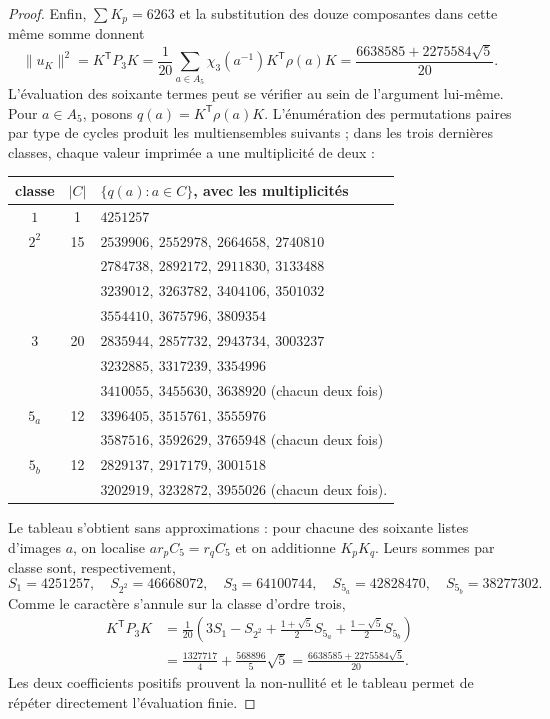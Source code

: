 \begin{proof}
Enfin, \(\sum K_p=6263\) et la substitution des douze
composantes dans cette même somme donnent
\[
 \lVert u_K\rVert^2=K^{\mathsf T}P_3K
 =\frac1{20}\sum_{a\in A_5}
                \chi_3(a^{-1})K^{\mathsf T}\rho(a)K
 =\frac{6638585+2275584\sqrt5}{20}.
\]
L’évaluation des soixante termes peut se vérifier au sein de
l’argument lui-même. Pour \(a\in A_5\), posons
\(q(a)=K^{\mathsf T}\rho(a)K\). L’énumération des permutations
paires par type de cycles produit les multiensembles suivants ; dans les
trois dernières classes, chaque valeur imprimée a une multiplicité de deux :
\begin{center}
\footnotesize
\setlength{\tabcolsep}{5pt}
\begin{tabular}{@{}c|c|l@{}}
\textbf{classe}&\(\lvert C\rvert\)&
\(\{q(a):a\in C\}\), avec les multiplicités\\ \hline
\(1\)&1&\(4251257\)\\
\(2^2\)&15&
\(2539906,\ 2552978,\ 2664658,\ 2740810\)\\
&&\(2784738,\ 2892172,\ 2911830,\ 3133488\)\\
&&\(3239012,\ 3263782,\ 3404106,\ 3501032\)\\
&&\(3554410,\ 3675796,\ 3809354\)\\
\(3\)&20&
\(2835944,\ 2857732,\ 2943734,\ 3003237\)\\
&&\(3232885,\ 3317239,\ 3354996\)\\
&&\(3410055,\ 3455630,\ 3638920\)\quad
   (chacun deux fois)\\
\(5_a\)&12&
\(3396405,\ 3515761,\ 3555976\)\\
&&\(3587516,\ 3592629,\ 3765948\)\quad
   (chacun deux fois)\\
\(5_b\)&12&
\(2829137,\ 2917179,\ 3001518\)\\
&&\(3202919,\ 3232872,\ 3955026\)\quad
   (chacun deux fois).
\end{tabular}
\end{center}
Le tableau s’obtient sans approximations : pour chacune des soixante
listes d’images \(a\), on localise \(ar_pC_5=r_qC_5\) et on additionne
\(K_pK_q\). Leurs sommes par classe sont, respectivement,
\[
 S_1=4251257,\quad S_{2^2}=46668072,\quad S_3=64100744,\quad
 S_{5_a}=42828470,\quad S_{5_b}=38277302.
\]
Comme le caractère s'annule sur la classe d'ordre trois,
\begin{align*}
 K^{\mathsf T}P_3K
 &=\frac1{20}\left(3S_1-S_{2^2}
       +\frac{1+\sqrt5}{2}S_{5_a}
       +\frac{1-\sqrt5}{2}S_{5_b}\right)\\
 &=\frac{1327717}{4}+\frac{568896}{5}\sqrt5
  =\frac{6638585+2275584\sqrt5}{20}.
\end{align*}
Les deux coefficients positifs prouvent la non-nullité et le tableau permet de répéter directement l'évaluation finie.
\end{proof}

